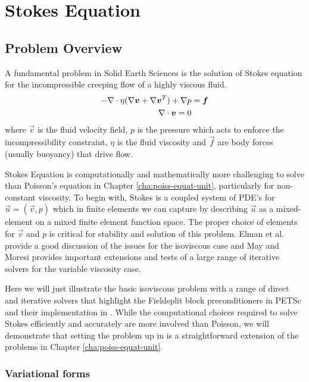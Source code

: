 \chapter{Stokes Equation}
\label{cha:stokes-equation}

\section{Problem Overview}
\label{sec:problem-formulation}

A fundamental problem in Solid Earth Sciences is the solution of
Stokes equation for the incompressible creeping flow of a highly
viscous fluid.
\begin{align}
-\nabla\cdot\eta(\nabla{\mbox{\boldmath$v$}} + \nabla{\mbox{\boldmath$v$}}^{T}) + \nabla p &= {\mbox{\boldmath$f$}}\\ 
\nabla\cdot {\mbox{\boldmath$v$}} = 0 & 
\end{align}
where $\vec{v}$ is the fluid velocity field,  $p$ is the pressure
which acts to enforce the incompressibility constraint, $\eta$ is the
fluid viscosity and $\vec{f}$ are body forces (usually buoyancy) that
drive flow.

Stokes Equation is computationally and mathematically more challenging
to solve than Poisson's equation in Chapter
\ref{cha:poiss-equat-unit}, particularly for non-constant viscosity.
To begin with, Stokes is a coupled system of PDE's for $\vec{u} =
(\vec{v},p)$ which in finite elements we can capture by describing
$\vec{u}$ as a mixed-element on a mixed finite element function space.
The proper choice of elements for $\vec{v}$ and $p$ is critical for
stability and solution of this problem.  Elman et
al. \cite{elman_finite_2005} provide a good discussion of the issues
for the isoviscous case and May and Moresi \cite{may_preconditioned_2008} provides
important extensions and tests of a large range of iterative solvers
for the variable viscosity case.

Here we will just illustrate the basic isoviscous problem with a range
of direct and iterative solvers that highlight the Fieldsplit block
preconditioners in PETSc \cite{brown_composable_2012} and their
implementation in \TF{}.  While the computational choices required to
solve Stokes efficiently and accurately are more involved
than Poisson,  we will demonstrate that setting the problem up in
\TF{} is a straightforward extension of the problems in Chapter
\ref{cha:poiss-equat-unit}. 

\subsection{Variational forms}
\label{sec:variational-forms}

